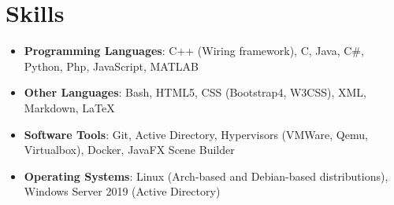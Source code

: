 \documentclass[letterpaper,11pt]{article}
\makeatletter
\newcommand{\resumeItem}[2]{
  \item\small{
    \textbf{#1}{: #2 \vspace{-2pt}}
  }
}
\newcommand{\resumeSubheading}[4]{
  \vspace{-1pt}\item
    \begin{tabular*}{0.97\textwidth}{l@{\extracolsep{\fill}}r}
      \textbf{#1} & #2 \\
      \textit{\small#3} & \textit{\small #4} \\
    \end{tabular*}\vspace{-5pt}
}
\newcommand{\resumeSubHeadingListStart}{\begin{itemize}[leftmargin=*]}
\newcommand{\resumeSubHeadingListEnd}{\end{itemize}}
\newcommand{\resumeItemListStart}{\begin{itemize}}
\newcommand{\resumeItemListEnd}{\end{itemize}\vspace{-5pt}}
\makeatother
\begin{document}
\begin{comment}    
    \resumeSubheading
      {UBM - Unibo Motorsport Team}{Bologna, Italy}
      {Software developer}{Oct. 2023 - Current}
      \resumeItemListStart
        \resumeItem{Python}
          {I improved the back-end of the application, implementing new features, 
            documenting the code and fixing bugs.
            In particular:}
            \resumeItemListStart
                \resumeItem{Connection pooling}
                    {I implemented a connection pool to the database, to avoid the overhead of creating a new connection every time a request is made.}
            \resumeItemListEnd
      \resumeItemListEnd

  
    \resumeSubheading
      {Other Company}{Location}
      {Position}{From - To}
      \resumeItemListStart
        \resumeItem{Technology you worked with/on}
          {Description}
        \resumeItem{Other technology you worked with/on}
          {Description}
      \resumeItemListEnd

    \resumeSubheading
      {Research Position}{Location}
      {Position}{From - To}
      \resumeItemListStart
        \resumeItem{Technology you worked with/on}
          {Description}
        \resumeItem{Other technology you worked with/on}
          {Description}
      \resumeItemListEnd
\end{comment}

\begin{comment}
\section{Languages}
    \resumeSubHeadingListStart
    \resumeItem
      {Italian}{Native speaker}
    \resumeItem
      {English}{Level C1}
  \resumeSubHeadingListEnd
\end{comment}

\section{Skills}
 \resumeSubHeadingListStart
   \item{
     \textbf{Programming Languages}{: C++ (Wiring framework), C, Java, C\#, Python, Php, JavaScript, MATLAB}
     \hfill
     }
     \item{
     \textbf{Other Languages}{: Bash, HTML5, CSS (Bootstrap4, W3CSS), XML, Markdown, LaTeX}
     \hfill
     }
     \item{
     \textbf{Software Tools}{: Git, Active Directory, Hypervisors (VMWare, Qemu, Virtualbox), Docker, JavaFX Scene Builder}
     \hfill
     }
     \item{
     \textbf{Operating Systems}{: Linux (Arch-based and Debian-based distributions), Windows Server 2019 (Active Directory)}
     }
 \resumeSubHeadingListEnd
\end{document}
